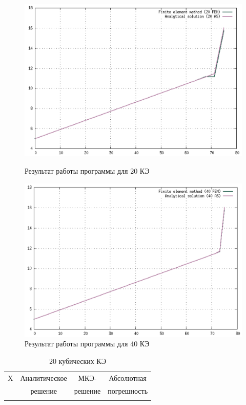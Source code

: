 {{{{{\begin{figure}[!h]
    \centering
    \begin{minipage}{0.5\textwidth}
        \centering
        \includegraphics[width=1\textwidth]{labs/img/cub/20.png} %
        \caption{Результат работы программы для 20 КЭ}
        \label{c_20}
    \end{minipage}\hfill
    \begin{minipage}{0.5\textwidth}
        \centering
        \includegraphics[width=1\textwidth]{labs/img/cub/40.png} %
        \caption{Результат работы программы для 40 КЭ}
        \label{c_40}
    \end{minipage}
\end{figure}

\begin{table}[H]
\centering
\begin{tabular}{|c|c|c|c|}
\hline
X & Аналитическое & МКЭ-    & Абсолютная \\
  & решение       & решение & погрешность \\
\hline
 \\
\hline
\end{tabular}
\caption{20 кубических КЭ}
\label{table:lin_20}
\end{table}

}}}}}
